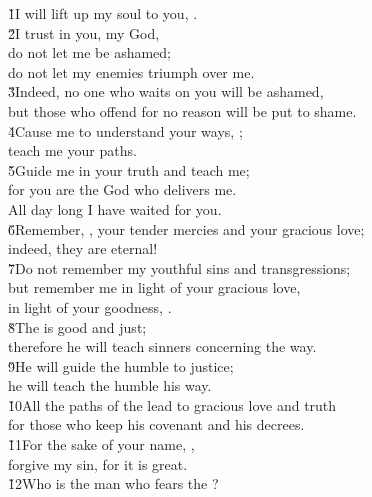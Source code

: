 \begin{poetry}
\poeml \v{1}I will lift up my soul to you, . \\
\poeml \v{2}I trust in you, my God, \\
\poemll    do not let me be ashamed; \\
\poemlll       do not let my enemies triumph over me. \\
\poeml \v{3}Indeed, no one who waits on you will be ashamed, \\
\poemll    but those who offend for no reason will be put to shame. \\
\poeml \v{4}Cause me to understand your ways, ; \\
\poemll    teach me your paths. \\
\poeml \v{5}Guide me in your truth and teach me; \\
\poemll    for you are the God who delivers me. \\
\poemlll       All day long I have waited for you. \\
\poeml \v{6}Remember, , your tender mercies and your gracious love; \\
\poemll    indeed, they are eternal! \\
\poeml \v{7}Do not remember my youthful sins and transgressions; \\
\poemll    but remember me in light of your gracious love, \\
\poemlll       in light of your goodness, . \\
\poeml \v{8}The  is good and just; \\
\poemll    therefore he will teach sinners concerning the way. \\
\poeml \v{9}He will guide the humble to justice; \\
\poemll    he will teach the humble his way. \\
\poeml \v{10}All the paths of the  lead to gracious love and truth \\
\poemll    for those who keep his covenant and his decrees. \\
\poeml \v{11}For the sake of your name, , \\
\poemll    forgive my sin, for it is great. \\
\poeml \v{12}Who is the man who fears the ? \\

\end{poetry}
